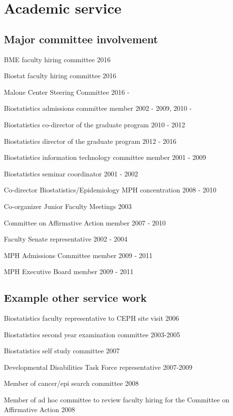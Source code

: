 \documentclass[12pt]{article}
\begin{document}
\section*{Academic service} 
\subsection*{Major committee involvement}
\begin{description}
\item BME faculty hiring committee 2016
\item Biostat faculty hiring committee 2016
\item Malone Center Steering Committee 2016 -
\item Biostatistics admissions committee member 2002 - 2009, 2010 -
\item Biostatistics co-director of the graduate program 2010 - 2012
\item Biostatistics director of the graduate program 2012 - 2016
\item Biostatistics information technology committee member 2001 - 2009 
\item Biostatistics seminar coordinator 2001 - 2002 
\item Co-director Biostatistics/Epidemiology MPH concentration 2008 - 2010
\item Co-organizer Junior Faculty Meetings 2003 
\item Committee on Affirmative Action member 2007 - 2010
\item Faculty Senate representative 2002 - 2004 
\item MPH Admissions Committee member 2009 - 2011
\item MPH Executive Board member 2009 -  2011
\end{description}

\subsection*{Example other service work}
\begin{description}
\item Biostatistics faculty representative to CEPH site visit 2006 
\item Biostatistics second year examination committee 2003-2005 
\item Biostatistics self study committee 2007 
\item Developmental Disabilities Task Force representative 2007-2009 
\item Member of cancer/epi search committee 2008 
\item Member of ad hoc committee to review faculty hiring for the Committee on Affirmative Action 2008 
\end{description}
\end{document}
